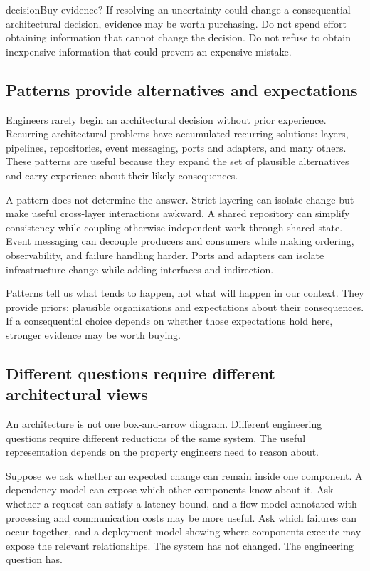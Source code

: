 \begin{bookbox}{decision}{Buy evidence?} %
If resolving an uncertainty could change a consequential architectural decision, evidence may be worth purchasing.
Do not spend effort obtaining information that cannot change the decision.
Do not refuse to obtain inexpensive information that could prevent an expensive mistake.
\end{bookbox}

\subsection{Patterns provide alternatives and expectations}\label{sec-patterns}

Engineers rarely begin an architectural decision without prior experience. Recurring architectural
problems have accumulated recurring solutions: layers, pipelines, repositories, event messaging,
ports and adapters, and many others. These patterns are useful because they expand the set of
plausible alternatives and carry experience about their likely consequences.

A pattern does not determine the answer. Strict layering can isolate change but make useful
cross-layer interactions awkward. A shared repository can simplify consistency while coupling
otherwise independent work through shared state. Event messaging can decouple producers and
consumers while making ordering, observability, and failure handling harder. Ports and adapters
can isolate infrastructure change while adding interfaces and indirection.

Patterns tell us what tends to happen, not what will happen in our context. They provide priors:
plausible organizations and expectations about their consequences. If a consequential choice
depends on whether those expectations hold here, stronger evidence may be worth buying.

\subsection{Different questions require different architectural views}\label{sec-architectural-views}

An architecture is not one box-and-arrow diagram. Different engineering questions require
different reductions of the same system. The useful representation depends on the property
engineers need to reason about.

Suppose we ask whether an expected change can remain inside one component. A dependency model can
expose which other components know about it. Ask whether a request can satisfy a latency bound,
and a flow model annotated with processing and communication costs may be more useful. Ask which
failures can occur together, and a deployment model showing where components execute may expose
the relevant relationships. The system has not changed. The engineering question has.

